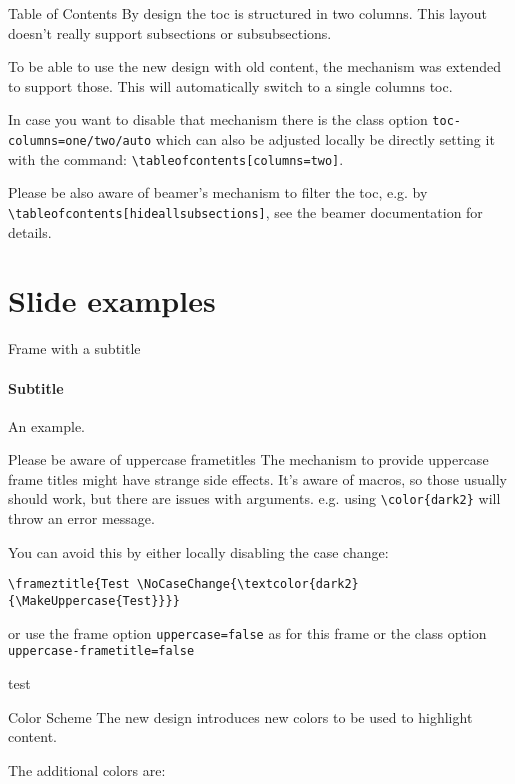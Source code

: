 \documentclass[
	english,%
	design=2023,%
]{tudabeamer}
\newcommand*{\code}[1]{\texttt{#1}}
\begin{document}
\begin{frame}{Table of Contents}
By design the toc is structured in two columns.
This layout doesn't really support subsections or subsubsections.

To be able to use the new design with old content, the mechanism was extended to support those.
This will automatically switch to a single columns toc.

In case you want to disable that mechanism there is the class option \code{toc-columns=one/two/auto} which can also be adjusted locally be directly setting it with the command: \code{\textbackslash{}tableofcontents[columns=two]}.

Please be also aware of beamer's mechanism to filter the toc, e.g. by \code{\textbackslash{}tableofcontents[hideallsubsections]}, see the beamer documentation for details.
\end{frame}

\section{Slide examples}

\begin{frame}{Frame with a subtitle}
\framesubtitle{Subtitle}
An example.
\end{frame}

\begin{frame}[fragile,uppercase=false]{Please be aware of uppercase frametitles}
The mechanism to provide uppercase frame titles might have strange side effects.
It's aware of macros, so those usually should work, but there are issues with arguments. e.g. using \verb+\color{dark2}+ will throw an error message.

You can avoid this by either locally disabling the case change:

\begin{verbatim}
\frameztitle{Test \NoCaseChange{\textcolor{dark2}{\MakeUppercase{Test}}}}
\end{verbatim}
or use the frame option \verb+uppercase=false+ as for this frame or the class option \verb+uppercase-frametitle=false+
\end{frame}

\textcolor{TUDa-dark1}{test}

\begin{frame}{Color Scheme}
The new design introduces new colors to be used to highlight content.

The additional colors are:

\renewcommand*{\do}[1]{TUDa-####1: \textcolor{TUDa-####1}{\rule{1cm}{\ht\strutbox}}\par}
\end{frame}
\end{document}
